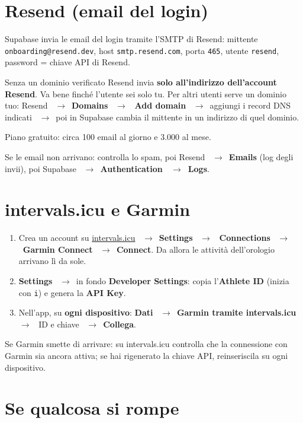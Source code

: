 \documentclass[11pt,a4paper]{article}
\newcommand{\ra}{\unskip\nobreak\ $\rightarrow$\ \ignorespaces}            %
\newcommand{\bt}[1]{\textbf{#1}}               %
\newcommand{\code}[1]{\texttt{#1}}             %
\begin{document}
\section{Resend (email del login)}\label{sec:resend}

Supabase invia le email del login tramite l'SMTP di Resend: mittente \code{onboarding@resend.dev},
host \code{smtp.resend.com}, porta \code{465}, utente \code{resend}, password = chiave API di Resend.

\begin{importante}
Senza un dominio verificato Resend invia \bt{solo all'indirizzo dell'account Resend}. Va bene finché
l'utente sei solo tu. Per altri utenti serve un dominio tuo: Resend \ra \bt{Domains} \ra
\bt{Add domain} \ra aggiungi i record DNS indicati \ra poi in Supabase cambia il mittente in un
indirizzo di quel dominio.
\end{importante}

Piano gratuito: circa 100 email al giorno e 3.000 al mese.

Se le email non arrivano: controlla lo spam, poi Resend \ra \bt{Emails} (log degli invii), poi
Supabase \ra \bt{Authentication \ra Logs}.

\section{intervals.icu e Garmin}\label{sec:intervals}

\begin{enumerate}
  \item Crea un account su \href{https://intervals.icu}{intervals.icu} \ra \bt{Settings} \ra
    \bt{Connections} \ra \bt{Garmin Connect} \ra \bt{Connect}. Da allora le attività
    dell'orologio arrivano lì da sole.
  \item \bt{Settings} \ra in fondo \bt{Developer Settings}: copia l'\bt{Athlete ID} (inizia con
    \code{i}) e genera la \bt{API Key}.
  \item Nell'app, su \bt{ogni dispositivo}: \bt{Dati} \ra \bt{Garmin tramite intervals.icu} \ra
    ID e chiave \ra \bt{Collega}.
\end{enumerate}

Se Garmin smette di arrivare: su intervals.icu controlla che la connessione con Garmin sia ancora
attiva; se hai rigenerato la chiave API, reinseriscila su ogni dispositivo.

\section{Se qualcosa si rompe}\label{sec:rotto}
\end{document}
